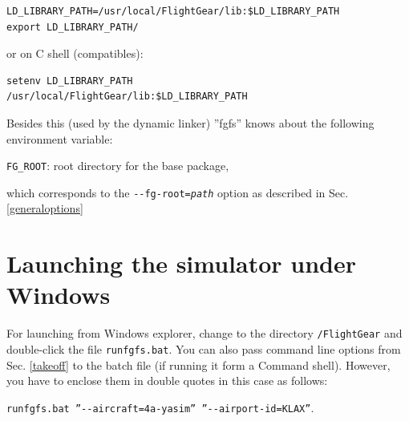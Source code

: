 \begin{verbatim}
LD_LIBRARY_PATH=/usr/local/FlightGear/lib:$LD_LIBRARY_PATH
export LD_LIBRARY_PATH/
\end{verbatim}

\noindent
 or on C shell (compatibles):
 
\begin{verbatim}
setenv LD_LIBRARY_PATH
/usr/local/FlightGear/lib:$LD_LIBRARY_PATH
\end{verbatim}

 \noindent
Besides this (used by the dynamic linker) ''fgfs'' knows about the following environment variable:
\noindent

\verb/FG_ROOT/: root directory for the \FlightGear{} base package,

\noindent
 which corresponds to the \texttt{-$ $-fg-root={\it path}} option as described in Sec. \ref{generaloptions}

\section{Launching the simulator under Windows}
For launching \FlightGear{} from Windows explorer, change to the directory \texttt{/FlightGear} and double-click the file \texttt{runfgfs.bat}. You can also pass command line options from Sec. \ref{takeoff} to the batch file (if running it form a Command shell). However, you have to enclose them in double quotes in this case as follows:
\medskip

\noindent
\texttt{runfgfs.bat ''-$ $-aircraft=4a-yasim'' ''-$ $-airport-id=KLAX''}.
 \medskip

 \centerline{}
\smallskip

